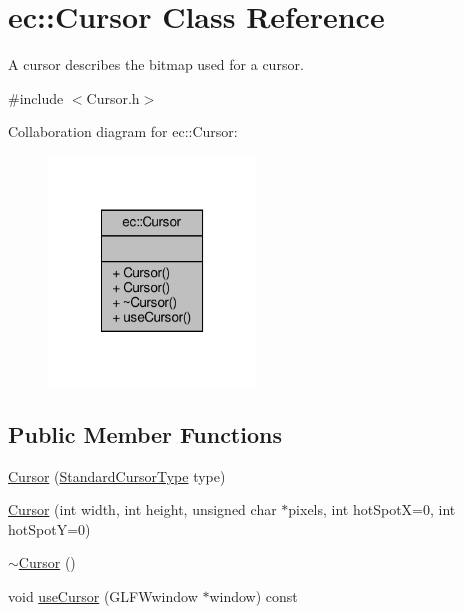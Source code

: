 \hypertarget{classec_1_1_cursor}{}\section{ec\+:\+:Cursor Class Reference}
\label{classec_1_1_cursor}


A cursor describes the bitmap used for a cursor.  




{\ttfamily \#include $<$Cursor.\+h$>$}



Collaboration diagram for ec\+:\+:Cursor\+:\nopagebreak
\begin{figure}[H]
\begin{center}
\leavevmode
\includegraphics[width=156pt]{classec_1_1_cursor__coll__graph}
\end{center}
\end{figure}
\subsection*{Public Member Functions}
\begin{DoxyCompactItemize}
\item 
\mbox{\hyperlink{classec_1_1_cursor_a7fd103f9e129b2952484999510d8576a}{Cursor}} (\mbox{\hyperlink{namespaceec_ab32dc7f72e1021f7625fca2b4693d297}{Standard\+Cursor\+Type}} type)
\item 
\mbox{\hyperlink{classec_1_1_cursor_adcbabc67fe488264ee580bcae53de8df}{Cursor}} (int width, int height, unsigned char $\ast$pixels, int hot\+SpotX=0, int hot\+SpotY=0)
\item 
\mbox{\hyperlink{classec_1_1_cursor_a4617172c5106164b27ef856df0b078c3}{$\sim$\+Cursor}} ()
\item 
void \mbox{\hyperlink{classec_1_1_cursor_ad99efc837c8f7fb348d2ea7c3bd230d4}{use\+Cursor}} (G\+L\+F\+Wwindow $\ast$window) const
\end{DoxyCompactItemize}


